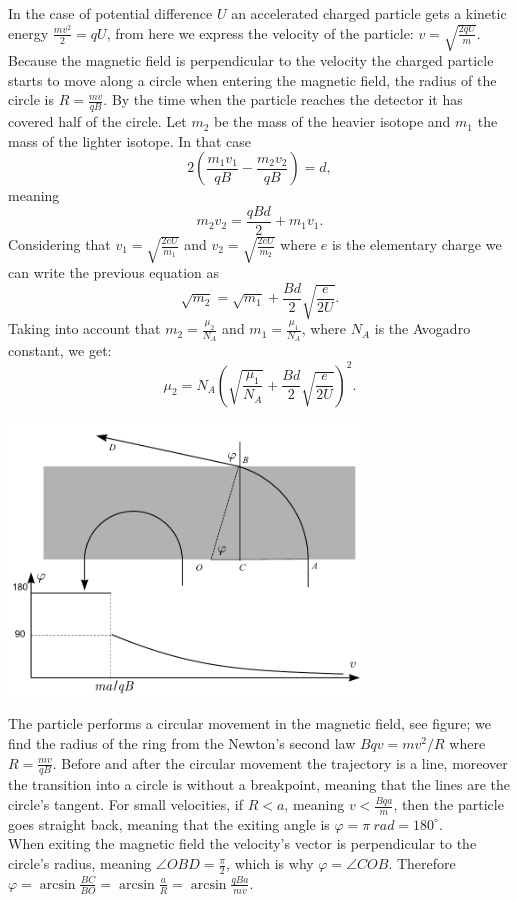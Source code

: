 \documentclass[11pt]{article}
\begin{document}
\solueng
In the case of potential difference $U$ an accelerated charged particle gets a kinetic energy $\frac{mv^{2}}{2}=qU$, from here we express the velocity of the particle: $v=\sqrt{\frac{2qU}{m}}$. Because the magnetic field is perpendicular to the velocity the charged particle starts to move along a circle when entering the magnetic field, the radius of the circle is $R=\frac{mv}{qB}$. By the time when the particle reaches the detector it has covered half of the circle. Let $m_{2}$ be the mass of the heavier isotope and $m_{1}$ the mass of the lighter isotope. In that case
\[ 
2\left(\frac{m_{1}v_{1}}{qB}-\frac{m_{2}v_{2}}{qB}\right)=d, 
\]
meaning 
\[ 
m_{2}v_{2}=\frac{qBd}{2}+m_{1}v_{1 }.
\]
Considering that $v_{1}=\sqrt{\frac{2eU}{m_{1}}}$ and $v_{2}=\sqrt{\frac{2eU}{m_{2}}}$ where $e$ is the elementary charge we can write the previous equation as 
\[ \sqrt{m_{2}}=\sqrt{m_{1}}+\frac{Bd}{2}\sqrt{\frac{e}{2U}}. \]
Taking into account that $m_{2}=\frac{\mu_{2}}{N_{A}}$ and $m_{1}=\frac{\mu_{1}}{N_{A}}$, where $N_{A}$ is the Avogadro constant, we get:
\[ \mu_{2}=N_{A}\left(\sqrt{\frac{\mu_{1}}{N_{A}}}+\frac{Bd}{2}\sqrt{\frac{e}{2U}}\right)^{2}.\]
\probend
\bigskip


\solueng
\begin{center}
\includegraphics[width=0.7\textwidth]{2015-v2g-09-magnetvalilah}
\end{center}
The particle performs a circular movement in the magnetic field, see figure; we find the radius of the ring from the Newton’s second law $Bqv=mv^2/R$ where $R=\frac{mv}{qB}$. Before and after the circular movement the trajectory is a line, moreover the transition into a circle is without a breakpoint, meaning that the lines are the circle’s tangent. For small velocities, if $R<a$, meaning $v<\frac{Bqa}{m}$, then the particle goes straight back, meaning that the exiting angle is $\varphi=\pi \SI{}{rad}=180^\circ$.\\
When exiting the magnetic field the velocity’s vector is perpendicular to the circle’s radius, meaning $\angle OBD=\frac \pi 2$, which is why $\varphi=\angle COB$. Therefore $\varphi=\arcsin \frac{BC}{BO}=\arcsin \frac{a}{R}=\arcsin \frac{qBa}{mv}$.
\probend
\bigskip
\end{document}
